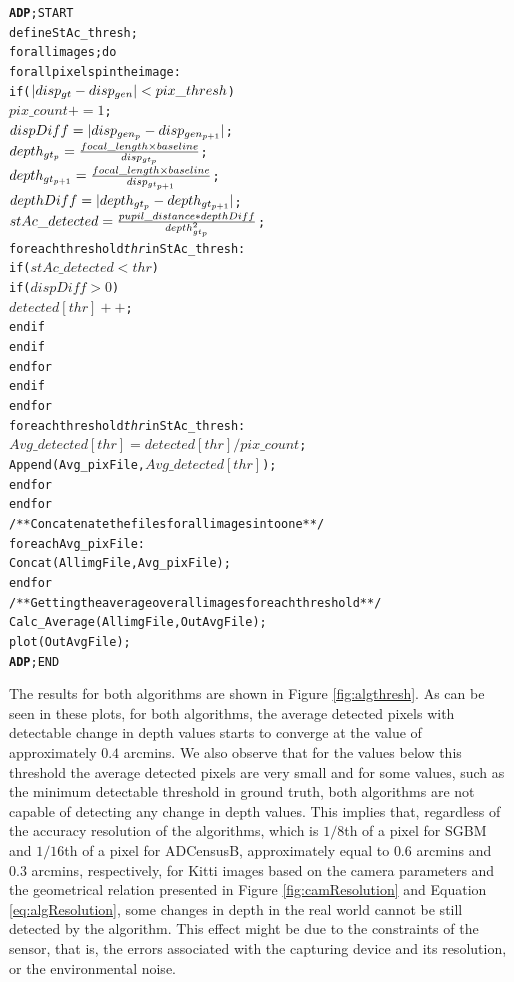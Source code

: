 \begin{alltt}
\textbf{ADP}; START
      define StAc\_thresh;
      for all images; do
         for all pixels p in the image:
            if (\( |disp\sb{gt}-disp\sb{gen}|<pix\_thresh\))
               \(pix\_count += 1\);
               \(dispDiff = |disp\sb{gen\sb{p}}-disp\sb{gen\sb{p+1}}|\);
               \(depth\sb{gt\sb{p}} = \frac{focal\_length \times baseline}{disp\sb{gt\sb{p}}}\);
               \(depth\sb{gt\sb{p+1}} = \frac{focal\_length \times baseline}{disp\sb{gt\sb{p+1}}}\);
               \(depthDiff = |depth\sb{gt\sb{p}}-depth\sb{gt\sb{p+1}}|\);
               \(stAc\_detected = \frac{pupil\_distance*depthDiff}{depth\sb{gt\sb{p}}\sp{2}}\);
               for each threshold \textit{thr} in StAc\_thresh:
                  if (\(stAc\_detected<thr\))
                     if (\(dispDiff>0\))
                        \(detected[thr]++\);
                     end if
                  end if
               end for
            end if
         end for
         for each threshold \textit{thr} in StAc\_thresh:
            \(Avg\_detected[thr] = detected[thr]/pix\_count\);
            Append(Avg\_pixFile, \(Avg\_detected[thr]\));
         end for
      end for
      /**Concatenate the files for all images into one **/
      for each Avg\_pixFile:
         Concat(AllimgFile,Avg\_pixFile);
      end for
      /**Getting the average over all images for each threshold**/
      Calc\_Average(AllimgFile, OutAvgFile);
      plot(OutAvgFile);
\textbf{ADP}; END
\end{alltt}
The results for both algorithms are shown in Figure \ref{fig:algthresh}.
As can be seen in these plots, for both algorithms, the average detected pixels with detectable change in depth values 
starts to converge at the value of approximately $0.4$ arcmins.
We also observe that for the values below this threshold the average detected pixels are very small and for some values, 
such as the minimum detectable threshold in ground truth,
both algorithms are not capable of detecting any change in depth values. 
This implies that, regardless of the accuracy resolution of the algorithms, which is $1/8$th of a pixel for SGBM and $1/16$th of a pixel for ADCensusB, approximately equal to
$0.6$ arcmins and $0.3$ arcmins, respectively, for Kitti images based on the camera parameters and the geometrical relation presented in Figure \ref{fig:camResolution} and 
Equation \ref{eq:algResolution}, some changes in 
depth in the real world cannot be still detected by the algorithm. This effect might be due to the constraints of the sensor, that is, the errors associated with the capturing 
device and its resolution, or the environmental noise. 


